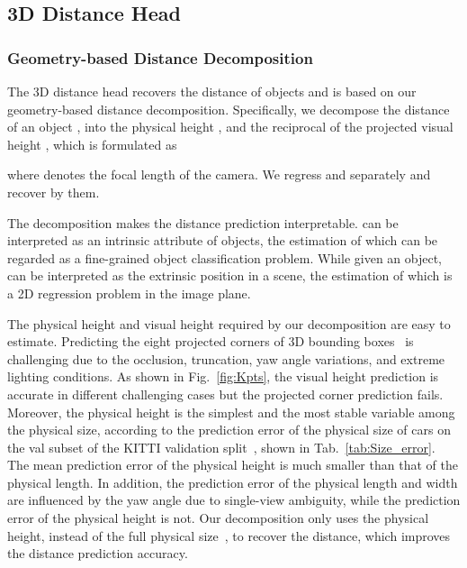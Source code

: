 \documentclass[10pt,twocolumn,letterpaper]{article}
\begin{document}
\subsection{3D Distance Head}

\subsubsection{Geometry-based Distance Decomposition}
The 3D distance head recovers the distance of objects and is based on our geometry-based distance decomposition. Specifically, we decompose the distance of an object , into the physical height , and the reciprocal of the projected visual height , which is formulated as 

where  denotes the focal length of the camera. We regress  and  separately and recover  by them. 

The decomposition makes the distance prediction interpretable.  can be interpreted as an intrinsic attribute of objects, the estimation of which can be regarded as a fine-grained object classification problem. While given an object,  can be interpreted as the extrinsic position in a scene, the estimation of which is a 2D regression problem in the image plane.


The physical height and visual height required by our decomposition are easy to estimate. Predicting the eight projected corners of 3D bounding boxes~\cite{DBLP:journals/corr/abs-1906-08070,DBLP:conf/eccv/LiZLC20} is challenging due to the occlusion, truncation, yaw angle variations, and extreme lighting conditions. As shown in Fig.~\ref{fig:Kpts}, the visual height prediction is accurate in different challenging cases but the projected corner prediction fails.
Moreover, the physical height is the simplest and the most stable variable among the physical size, according to the prediction error of the physical size of cars on the val subset of the KITTI validation split~\cite{DBLP:conf/nips/ChenKZBMFU15}, shown in Tab.~\ref{tab:Size_error}. The mean prediction error of the physical height is much smaller than that of the physical length. In addition, the prediction error of the physical length and width are influenced by the yaw angle due to single-view ambiguity, while the prediction error of the physical height is not. Our decomposition only uses the physical height, instead of the full physical size~\cite{DBLP:journals/corr/abs-1906-08070,DBLP:conf/eccv/LiZLC20}, to recover the distance, which improves the distance prediction accuracy.
\end{document}

